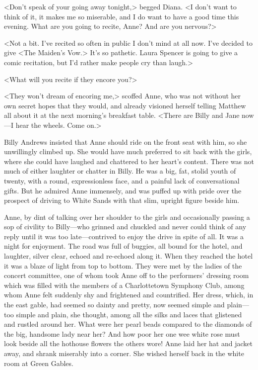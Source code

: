 <Don't speak of your going away tonight,> begged Diana. <I don't want to think of it, it makes me so miserable, and I do want to have a good time this evening. What are you going to recite, Anne? And are you nervous?>

<Not a bit. I've recited so often in public I don't mind at all now. I've decided to give <The Maiden's Vow.> It's so pathetic. Laura Spencer is going to give a comic recitation, but I'd rather make people cry than laugh.>

<What will you recite if they encore you?>

<They won't dream of encoring me,> scoffed Anne, who was not without her own secret hopes that they would, and already visioned herself telling Matthew all about it at the next morning's breakfast table. <There are Billy and Jane now—I hear the wheels. Come on.>

Billy Andrews insisted that Anne should ride on the front seat with him, so she unwillingly climbed up. She would have much preferred to sit back with the girls, where she could have laughed and chattered to her heart's content. There was not much of either laughter or chatter in Billy. He was a big, fat, stolid youth of twenty, with a round, expressionless face, and a painful lack of conversational gifts. But he admired Anne immensely, and was puffed up with pride over the prospect of driving to White Sands with that slim, upright figure beside him.

Anne, by dint of talking over her shoulder to the girls and occasionally passing a sop of civility to Billy—who grinned and chuckled and never could think of any reply until it was too late—contrived to enjoy the drive in spite of all. It was a night for enjoyment. The road was full of buggies, all bound for the hotel, and laughter, silver clear, echoed and re-echoed along it. When they reached the hotel it was a blaze of light from top to bottom. They were met by the ladies of the concert committee, one of whom took Anne off to the performers' dressing room which was filled with the members of a Charlottetown Symphony Club, among whom Anne felt suddenly shy and frightened and countrified. Her dress, which, in the east gable, had seemed so dainty and pretty, now seemed simple and plain—too simple and plain, she thought, among all the silks and laces that glistened and rustled around her. What were her pearl beads compared to the diamonds of the big, handsome lady near her? And how poor her one wee white rose must look beside all the hothouse flowers the others wore! Anne laid her hat and jacket away, and shrank miserably into a corner. She wished herself back in the white room at Green Gables.

